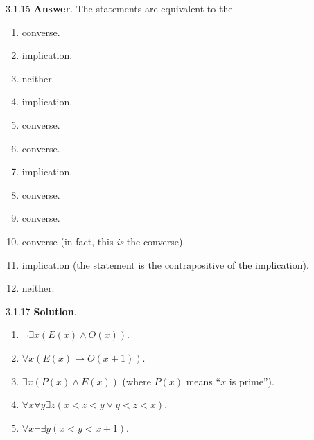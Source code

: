 \documentclass[11pt,]{book}
\theoremstyle{ptxplainnotitle}
\theoremstyle{ptxplaintitle}
\theoremstyle{ptxdefinitionnotitle}
\theoremstyle{ptxdefinitiontitle}
\theoremstyle{ptxdefinitionnotitle}
\theoremstyle{ptxdefinitiontitle}
\theoremstyle{ptxdefinitionnotitle}
\theoremstyle{ptxdefinitiontitle}
\theoremstyle{ptxdefinitiontitlenonumber}
\theoremstyle{ptxdefinitiontitlenonumber}
\numberwithin{equation}{chapter}
\newcommand{\imp}{\rightarrow}
\newcommand{\lt}{<}
\begin{document}
\begin{divisionexercise}{3.1.15}
\textbf{Answer}.\quad%
\hypertarget{p-2190}{}%
The statements are equivalent to the\textellipsis{} \leavevmode%
\begin{enumerate}[label=(\alph*)]
\item\hypertarget{li-1134}{}\hypertarget{p-2191}{}%
converse.%
\item\hypertarget{li-1135}{}\hypertarget{p-2192}{}%
implication.%
\item\hypertarget{li-1136}{}\hypertarget{p-2193}{}%
neither.%
\item\hypertarget{li-1137}{}\hypertarget{p-2194}{}%
implication.%
\item\hypertarget{li-1138}{}\hypertarget{p-2195}{}%
converse.%
\item\hypertarget{li-1139}{}\hypertarget{p-2196}{}%
converse.%
\item\hypertarget{li-1140}{}\hypertarget{p-2197}{}%
implication.%
\item\hypertarget{li-1141}{}\hypertarget{p-2198}{}%
converse.%
\item\hypertarget{li-1142}{}\hypertarget{p-2199}{}%
converse.%
\item\hypertarget{li-1143}{}\hypertarget{p-2200}{}%
converse (in fact, this \emph{is} the converse).%
\item\hypertarget{li-1144}{}\hypertarget{p-2201}{}%
implication (the statement is the contrapositive of the implication).%
\item\hypertarget{li-1145}{}\hypertarget{p-2202}{}%
neither.%
\end{enumerate}
%
\end{divisionexercise}%
\begin{divisionexercise}{3.1.17}
\textbf{Solution}.\quad%
\hypertarget{p-2211}{}%
\leavevmode%
\begin{enumerate}[label=(\alph*)]
\item\hypertarget{li-1151}{}\(\neg \exists x (E(x) \wedge O(x))\).%
\item\hypertarget{li-1152}{}\(\forall x (E(x) \imp O(x+1))\).%
\item\hypertarget{li-1153}{}\(\exists x(P(x) \wedge E(x))\) (where \(P(x)\) means ``\(x\) is prime'').%
\item\hypertarget{li-1154}{}\(\forall x \forall y \exists z(x \lt  z \lt  y \vee y \lt  z \lt  x)\).%
\item\hypertarget{li-1155}{}\(\forall x \neg \exists y (x \lt  y \lt  x+1)\).%
\end{enumerate}
%
\end{divisionexercise}%
\end{document}
